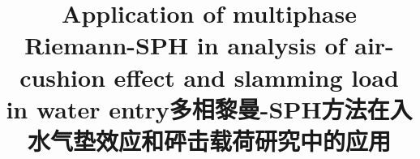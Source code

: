 \documentclass[UTF8]{ctexart}
\begin{document}
{
    \title{Application of multiphase Riemann-SPH in analysis of air-cushion effect and slamming load in water entry}
    \title{多相黎曼-SPH方法在入水气垫效应和砰击载荷研究中的应用}
}

    
\clearpage

\tableofcontents
\pagebreak


\pagebreak


\pagebreak
\end{document}
